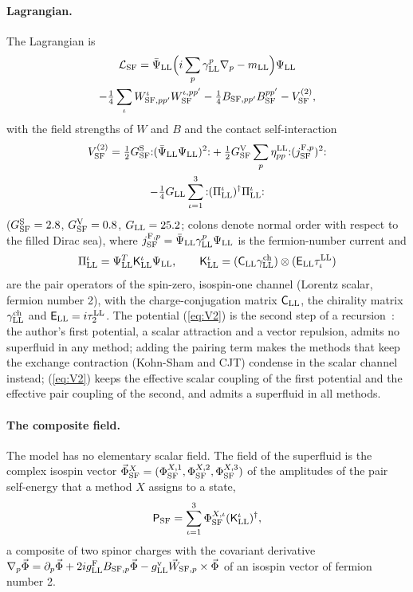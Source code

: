 \documentclass[aps,prd,twocolumn,superscriptaddress,nofootinbib,floatfix,longbibliography]{revtex4-2}
\newcommand{\LL}{{\rm LL}}
\newcommand{\SF}{{\rm SF}}
\begin{document}
\paragraph*{Lagrangian.}
The Lagrangian is
\begin{multline}
\mathcal L_\SF=\bar\Psi_\LL\Big(i\sum_p\gamma^p_\LL\nabla_p-m_\LL\Big)\Psi_\LL\\
-\tfrac14\sum_\iota W^\iota_{\SF,pp'}W^{\iota,pp'}_\SF-\tfrac14B_{\SF,pp'}B^{pp'}_\SF-V^{(2)}_\SF ,
\label{eq:L}
\end{multline}
with the field strengths of $W$ and $B$ and the contact self-interaction
\begin{multline}
V^{(2)}_\SF=\tfrac12G^{\rm S}_\SF{:}(\bar\Psi_\LL\Psi_\LL)^2{:}+\tfrac12G^{\rm V}_\SF\sum_p\eta^\LL_{pp}{:}(j^{{\rm F},p}_\SF)^2{:}\\
-\tfrac14G_\LL\sum_{\iota=1}^3{:}(\Pi^\iota_\LL)^\dagger\Pi^\iota_\LL{:}
\label{eq:V2}
\end{multline}
($G^{\rm S}_\SF=2.8$, $G^{\rm V}_\SF=0.8$, $G_\LL=25.2$; colons denote normal order with respect to the filled Dirac sea),
where $j^{{\rm F},p}_\SF=\bar\Psi_\LL\gamma^p_\LL\Psi_\LL$ is the fermion-number current and
\begin{equation}
\Pi^\iota_\LL=\Psi_\LL^T\mathsf K^\iota_\LL\Psi_\LL,\qquad\mathsf K^\iota_\LL=(\mathsf C_\LL\gamma^{\rm ch}_\LL)\otimes(\mathsf E_\LL\tau^\LL_\iota)
\label{eq:pairs}
\end{equation}
are the pair operators of the spin-zero, isospin-one channel (Lorentz scalar, fermion number 2), with the
charge-conjugation matrix $\mathsf C_\LL$, the chirality matrix $\gamma^{\rm ch}_\LL$ and $\mathsf E_\LL=i\tau^\LL_2$. The
potential (\ref{eq:V2}) is the second step of a recursion~\cite{SM}: the author's first potential, a scalar attraction and a
vector repulsion, admits no superfluid in any method; adding the pairing term makes the methods that keep the exchange
contraction (Kohn-Sham and CJT) condense in the scalar channel instead; (\ref{eq:V2}) keeps the effective scalar coupling of
the first potential and the effective pair coupling of the second, and admits a superfluid in all methods.

\paragraph*{The composite field.}
The model has no elementary scalar field. The field of the superfluid is the complex isospin vector
$\vec\Phi^X_\SF=(\Phi^{X,1}_\SF,\Phi^{X,2}_\SF,\Phi^{X,3}_\SF)$ of the amplitudes of the pair self-energy that a method $X$
assigns to a state,
\begin{equation}
\mathsf P_\SF=\sum_{\iota=1}^3\Phi^{X,\iota}_\SF(\mathsf K^\iota_\LL)^\dagger ,
\label{eq:Phi}
\end{equation}
a composite of two spinor charges with the covariant derivative
$\nabla_p\vec\Phi=\partial_p\vec\Phi+2ig^{\rm F}_\LL B_{\SF,p}\vec\Phi-g^{\rm v}_\LL\vec W_{\SF,p}\times\vec\Phi$ of an isospin
vector of fermion number 2.
\end{document}
